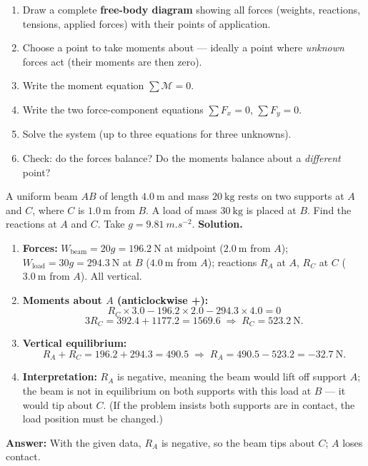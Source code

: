 \documentclass[11pt]{article}
\begin{document}
\begin{methode}
\begin{enumerate}
\item Draw a complete \textbf{free-body diagram} showing all forces (weights, reactions, tensions, applied forces) with their points of application.
\item Choose a point to take moments about — ideally a point where \emph{unknown} forces act (their moments are then zero).
\item Write the moment equation $\sum \mathcal{M}=0$.
\item Write the two force-component equations $\sum F_x=0$, $\sum F_y=0$.
\item Solve the system (up to three equations for three unknowns).
\item Check: do the forces balance? Do the moments balance about a \emph{different} point?
\end{enumerate}
\end{methode}

\begin{exoresolu}
A uniform beam $AB$ of length $4.0\ \mathrm{m}$ and mass $20\ \mathrm{kg}$ rests on two supports at $A$ and $C$, where $C$ is $1.0\ \mathrm{m}$ from $B$. A load of mass $30\ \mathrm{kg}$ is placed at $B$. Find the reactions at $A$ and $C$. Take $g=\SI{9.81}{m.s^{-2}}$.
\tcblower
\textbf{Solution.}
\begin{enumerate}
\item \textbf{Forces:} $W_{\text{beam}}=20g=196.2\ \mathrm{N}$ at midpoint ($2.0\ \mathrm{m}$ from $A$); $W_{\text{load}}=30g=294.3\ \mathrm{N}$ at $B$ ($4.0\ \mathrm{m}$ from $A$); reactions $R_A$ at $A$, $R_C$ at $C$ ($3.0\ \mathrm{m}$ from $A$). All vertical.
\item \textbf{Moments about $A$ (anticlockwise +):}
\[ R_C \times 3.0 - 196.2 \times 2.0 - 294.3 \times 4.0 = 0 \]
\[ 3R_C = 392.4 + 1177.2 = 1569.6 \;\Longrightarrow\; R_C = 523.2\ \mathrm{N}. \]
\item \textbf{Vertical equilibrium:}
\[ R_A + R_C = 196.2 + 294.3 = 490.5 \;\Longrightarrow\; R_A = 490.5 - 523.2 = -32.7\ \mathrm{N}. \]
\item \textbf{Interpretation:} $R_A$ is negative, meaning the beam would lift off support $A$; the beam is not in equilibrium on both supports with this load at $B$ — it would tip about $C$. (If the problem insists both supports are in contact, the load position must be changed.)
\end{enumerate}
\textbf{Answer:} With the given data, $R_A$ is negative, so the beam tips about $C$; $A$ loses contact.
\end{exoresolu}
\end{document}
